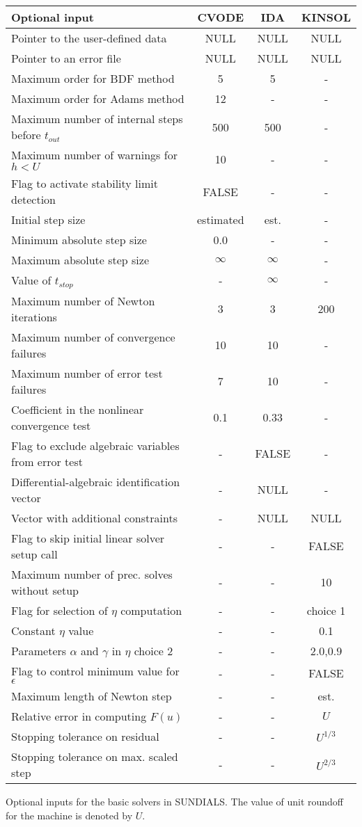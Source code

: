 \begin{acmtable}{340pt}
\centering
\begin{tabular}{p{2.75in} c c c }
Optional input & CVODE  & IDA & KINSOL \\
\hline
Pointer to the user-defined data & NULL & NULL& NULL \\
Pointer to an error file & NULL & NULL & NULL \\
Maximum order for BDF method & 5 & 5 & - \\
Maximum order for Adams method& 12  & - & - \\
Maximum number of internal steps before $t_{out}$ & 500 & 500 & - \\
Maximum number of warnings for $h < U$ & 10 & - & - \\
Flag to activate stability limit detection & FALSE & - & - \\
Initial step size & estimated & est. & - \\
Minimum absolute step size & 0.0 & - & - \\
Maximum absolute step size & $\infty$ & $\infty$ & - \\
Value of $t_{stop}$ & - & $\infty$ & - \\
Maximum number of Newton iterations & 3 & 3 & 200 \\
Maximum number of convergence failures & 10 & 10 & - \\
Maximum number of error test failures & 7 & 10 & - \\
Coefficient in the nonlinear convergence test & 0.1 & 0.33 & - \\
Flag to exclude algebraic variables from error test & - & FALSE & - \\
Differential-algebraic identification vector & - & NULL & - \\
Vector with additional constraints & - & NULL & NULL \\
Flag to skip initial linear solver setup call & - & - & FALSE \\
Maximum number of prec. solves without setup & - & - & 10 \\
Flag for selection of $\eta$ computation & - & - & choice 1 \\
Constant $\eta$ value & - & - & 0.1 \\
Parameters $\alpha$ and $\gamma$ in $\eta$ choice 2 & - & - & $2.0$,$0.9$\\
Flag to control minimum value for $\epsilon$ & - & - & FALSE \\
Maximum length of Newton step & - & - & est. \\
Relative error in computing $F(u)$ & - & - & $U$ \\
Stopping tolerance on residual & - & - & $U^{1/3}$ \\
Stopping tolerance on max. scaled step & - & - & $U^{2/3}$ \\
\end{tabular}
\caption{Optional inputs for the basic solvers in SUNDIALS. 
The value of unit roundoff for the machine is denoted by $U$.}
\label{t:optional_input}
\end{acmtable}

